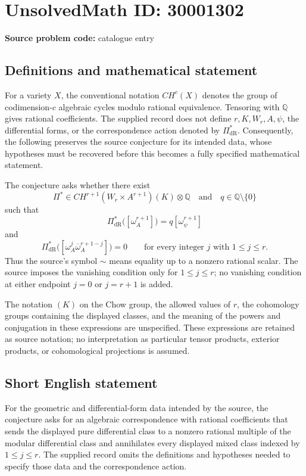 \documentclass[11pt]{article}
\newcommand{\Q}{\mathbb{Q}}
\begin{document}
\section*{UnsolvedMath ID: 30001302}
\textbf{Source problem code:} catalogue entry
\subsection{Definitions and mathematical statement}
For a variety \(X\), the conventional notation \(CH^c(X)\) denotes the group of codimension-\(c\) algebraic cycles modulo rational equivalence. Tensoring with \(\Q\) gives rational coefficients. The supplied record does not define \(r,K,W_r,A,\psi\), the differential forms, or the correspondence action denoted by \(\Pi^*_{\mathrm{dR}}\). Consequently, the following preserves the source conjecture for its intended data, whose hypotheses must be recovered before this becomes a fully specified mathematical statement.

The conjecture asks whether there exist
\[
\Pi^*\in CH^{r+1}(W_r\times A^{r+1})(K)\otimes\Q
\quad\text{and}\quad q\in\Q\setminus\{0\}
\]
such that
\[
\Pi^*_{\mathrm{dR}}\bigl([\omega_A^{r+1}]\bigr)
=q[\omega_\psi^{r+1}]
\]
and
\[
\Pi^*_{\mathrm{dR}}\bigl([\omega_A^j\overline{\omega}_A^{r+1-j}]\bigr)=0
\qquad\text{for every integer }j\text{ with }1\leq j\leq r.
\]
Thus the source's symbol \(\sim\) means equality up to a nonzero rational scalar. The source imposes the vanishing condition only for \(1\leq j\leq r\); no vanishing condition at either endpoint \(j=0\) or \(j=r+1\) is added.

The notation \((K)\) on the Chow group, the allowed values of \(r\), the cohomology groups containing the displayed classes, and the meaning of the powers and conjugation in these expressions are unspecified. These expressions are retained as source notation; no interpretation as particular tensor products, exterior products, or cohomological projections is assumed.
\subsection{Short English statement}
For the geometric and differential-form data intended by the source, the conjecture asks for an algebraic correspondence with rational coefficients that sends the displayed pure differential class to a nonzero rational multiple of the modular differential class and annihilates every displayed mixed class indexed by \(1\leq j\leq r\). The supplied record omits the definitions and hypotheses needed to specify those data and the correspondence action.
\end{document}
